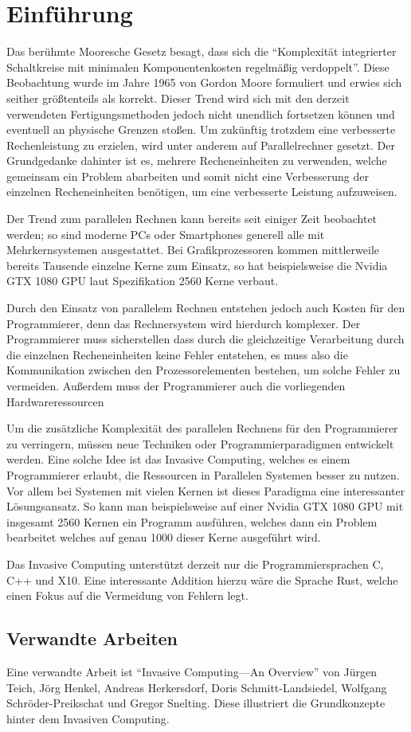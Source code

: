 \chapter{Einführung}\label{sec:intro}

Das berühmte Mooresche Gesetz besagt, dass sich die 
``Komplexität integrierter Schaltkreise mit minimalen Komponentenkosten regelmäßig verdoppelt''\cite{mooresLawWikiDe}.
Diese Beobachtung wurde im Jahre 1965 von Gordon Moore formuliert und erwies sich seither größtenteils als korrekt.
Dieser Trend wird sich mit den derzeit verwendeten Fertigungsmethoden jedoch nicht unendlich fortsetzen können und eventuell an
physische Grenzen stoßen. Um zukünftig trotzdem eine verbesserte Rechenleistung zu erzielen, wird unter anderem auf
Parallelrechner gesetzt. Der Grundgedanke dahinter ist es, mehrere Recheneinheiten zu verwenden, welche gemeinsam ein Problem
abarbeiten und somit nicht eine Verbesserung der einzelnen Recheneinheiten benötigen, um eine verbesserte Leistung aufzuweisen.

Der Trend zum parallelen Rechnen kann bereits seit einiger Zeit beobachtet werden; so sind moderne PCs oder Smartphones
generell alle mit Mehrkernsystemen ausgestattet. Bei Grafikprozessoren kommen mittlerweile bereits Tausende einzelne Kerne
zum Einsatz, so hat beispielsweise die Nvidia GTX 1080 GPU laut Spezifikation \cite{nvidia1080specs} 2560 Kerne verbaut.

Durch den Einsatz von parallelem Rechnen entstehen jedoch auch Kosten für den Programmierer, denn das Rechnersystem wird
hierdurch komplexer. Der Programmierer muss sicherstellen dass durch die gleichzeitige Verarbeitung durch die einzelnen
Recheneinheiten keine Fehler entstehen, es muss also die Kommunikation zwischen den Prozessorelementen bestehen, um solche
Fehler zu vermeiden. Außerdem muss der Programmierer auch die vorliegenden Hardwareressourcen

Um die zusätzliche Komplexität des parallelen Rechnens für den Programmierer zu verringern, müssen neue Techniken oder
Programmierparadigmen entwickelt werden. Eine solche Idee ist das Invasive Computing, welches es einem Programmierer
erlaubt, die Ressourcen in Parallelen Systemen besser zu nutzen. Vor allem bei Systemen mit vielen Kernen ist dieses Paradigma
eine interessanter Lösungsansatz. So kann man beispielsweise auf einer Nvidia GTX 1080 GPU mit insgesamt 2560 Kernen ein Programm
ausführen, welches dann ein Problem bearbeitet welches auf genau 1000 dieser Kerne ausgeführt wird.

Das Invasive Computing unterstützt derzeit nur die Programmiersprachen C, C++ und X10. Eine interessante Addition hierzu wäre
die Sprache Rust, welche einen Fokus auf die Vermeidung von Fehlern legt.

\section{Verwandte Arbeiten}

Eine verwandte Arbeit ist ``Invasive Computing—An Overview'' von Jürgen Teich, Jörg Henkel, Andreas Herkersdorf, Doris Schmitt-Landsiedel, Wolfgang Schröder-Preikschat und Gregor Snelting. Diese illustriert die Grundkonzepte hinter dem Invasiven Computing.